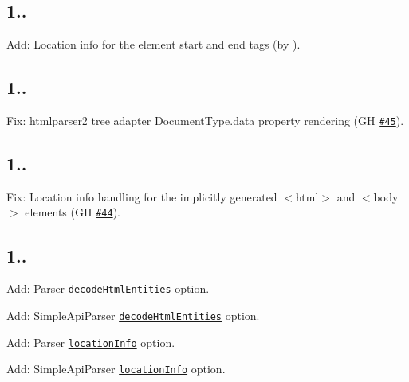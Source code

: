 \subsection*{1..}


\begin{DoxyItemize}
\item Add\+: Location info for the element start and end tags (by ).
\end{DoxyItemize}

\subsection*{1..}


\begin{DoxyItemize}
\item Fix\+: htmlparser2 tree adapter {\ttfamily Document\+Type.\+data} property rendering (GH \href{https://github.com/inikulin/parse5/issues/45}{\tt \#45}).
\end{DoxyItemize}

\subsection*{1..}


\begin{DoxyItemize}
\item Fix\+: Location info handling for the implicitly generated {\ttfamily $<$html$>$} and {\ttfamily $<$body$>$} elements (GH \href{https://github.com/inikulin/parse5/issues/44}{\tt \#44}).
\end{DoxyItemize}

\subsection*{1..}


\begin{DoxyItemize}
\item Add\+: Parser \href{https://github.com/inikulin/parse5#optionsdecodehtmlentities}{\tt decode\+Html\+Entities} option.
\item Add\+: Simple\+Api\+Parser \href{https://github.com/inikulin/parse5#optionsdecodehtmlentities-1}{\tt decode\+Html\+Entities} option.
\item Add\+: Parser \href{https://github.com/inikulin/parse5#optionslocationinfo}{\tt location\+Info} option.
\item Add\+: Simple\+Api\+Parser \href{https://github.com/inikulin/parse5#optionslocationinfo-1}{\tt location\+Info} option.
\end{DoxyItemize}

